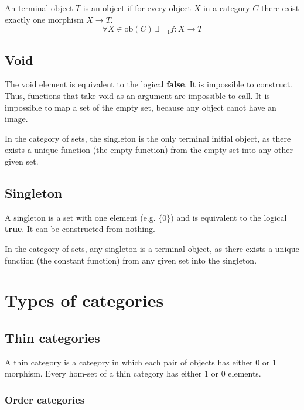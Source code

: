 \documentclass{article}
\begin{document}
An terminal object \(T\) is an object if
for every object \(X\) in a category \(C\)
there exist exactly one morphism \(X\to T\).
\[
    \forall X\in \text{ob}(C) \,\exists_{=1}f:X\to T
\]

\subsection{Void}

The void element is equivalent to the logical \textbf{false}.
It is impossible to construct. Thus, functions that take void
as an argument are impossible to call.
It is impossible to map a set of the empty set, because
any object canot have an image.

In the category of sets, the singleton is the only terminal initial object,
as there exists a unique function (the empty function) from the empty set
into any other given set.

\subsection{Singleton}

A singleton is a set with one element (e.g. \(\{0\}\)) and
is equivalent to the logical \textbf{true}.
It can be constructed from nothing.

In the category of sets, any singleton is a terminal object,
as there exists a unique function (the constant function) from any given
set into the singleton.


\pagebreak

\section{Types of categories}

\subsection{Thin categories}

A thin category is a category in which each pair of objects
has either \(0\) or \(1\) morphism.
Every hom-set of a thin category has either \(1\) or \(0\) elements.

\subsubsection{Order categories}
\end{document}
